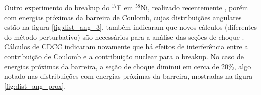 \documentclass[a4paper,12pt,oneside]{book}
\begin{document}
\par Outro experimento do breakup do $^{17}$F em $^{58}$Ni, realizado recentemente \cite{YANG2021136045}, porém com energias próximas da barreira de Coulomb, cujas distribuições angulares estão na figura \ref{fig:dist_ang_3}, também indicaram que novos cálculos (diferentes do método perturbativo) são necessários para a análise das seções de choque \cite{YANG2021136045, Kolata2016}. Cálculos de CDCC indicaram novamente que há efeitos de interferência entre a contribuição de Coulomb e a contribuição nuclear para o breakup. No caso de energias próximas da barreira, a seção de choque diminui em cerca de 20\%, algo notado nas distribuições com energias próximas da barreira, mostradas na figura \ref{fig:dist_ang_prox}.



\end{document}
